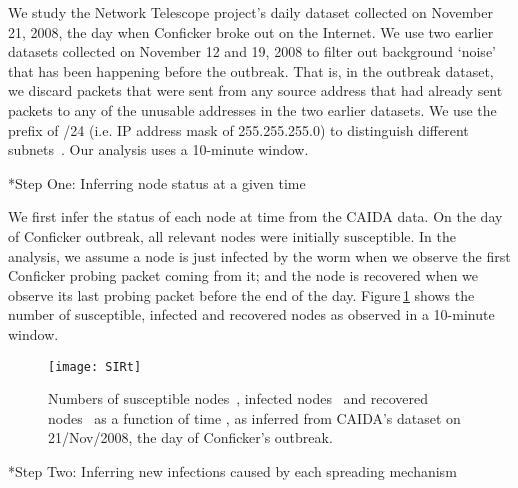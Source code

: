 \documentclass[9pt]{article}
\makeatletter
\newcommand{\reffig}[1]{Figure\,\ref{#1}}
\renewcommand{\subsection}{\@startsection {subsection}{2}{0pt}{-6pt}{1pt}{\reset@font \normalsize \bfseries}}
\makeatother
\begin{document}
{We study the Network Telescope project's daily dataset collected on November 21, 2008, the day when Conficker broke out on the Internet. 
We use two earlier datasets collected on November 12 and 19, 2008 to filter out background `noise' that has been happening before the outbreak. 
That is, in the outbreak dataset, we discard  packets that were sent from any source address that had already sent packets to any of the unusable addresses in the two earlier datasets.
We use the prefix of /24 (i.e. IP address mask of 255.255.255.0) to distinguish different subnets~\cite{Shin_2012}. Our analysis uses a 10-minute window. 









\subsection*{Step One: Inferring node status at a given time} 

We first infer the status of each node at time  from the CAIDA data.
On the day of Conficker outbreak, all relevant nodes were initially susceptible.
In the analysis, we assume a node is just infected by the worm when we observe the first Conficker probing packet coming from it; and the node is recovered when we observe its last probing packet before the end of the day. 
\reffig{fig-SIRt} shows the number of susceptible, infected and recovered nodes as observed in a 10-minute window.

\begin{figure}[h]\centering\small
\texttt{[image: SIRt]}
\caption{\label{fig-SIRt}Numbers of susceptible nodes~, infected nodes~ and recovered nodes~ as a function of time , as inferred from CAIDA's dataset on 21/Nov/2008, the day of Conficker's outbreak.}
\end{figure}

\subsection*{Step Two: Inferring new infections caused by each spreading mechanism} 

}
\end{document}

